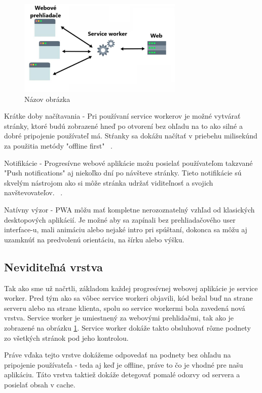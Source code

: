 \begin{figure}[H]
  \centering
  \includegraphics[width=0.7\textwidth]{img/image1.pdf}
  \caption{Názov obrázka \cite{Ater2017BuildingPWA}}
  \label{fig:obrazok1}
\end{figure}

Krátke doby načítavania - Pri používaní service workerov je možné vytvárať stránky, ktoré budú zobrazené hneď po otvorení bez ohľadu na to
ako silné a dobré pripojenie používateľ má. Stŕanky sa dokážu načítať v priebehu milisekúnd za použitia metódy "offline first" ~\cite{Ater2017BuildingPWA}.

Notifikácie - Progresívne webové aplikácie možu posielať používateľom takzvané "Push notifications" aj niekoľko dní po návšteve stránky. Tieto
notifikácie sú skvelým nástrojom ako si môže stránka udržať viditeľnosť a svojich navštevovateľov. ~\cite{Ater2017BuildingPWA}.

Natívny výzor - PWA môžu mať kompletne nerozoznatelný vzhľad od klasických desktopových aplikácií. Je možné aby sa zapínali bez prehliadačového
user interface-u, mali animáciu alebo nejaké intro pri spúštaní, dokonca sa môžu aj uzamknúť na predvolenú orientáciu, na šírku alebo výšku.

\subsection{Neviditeľná vrstva}
\label{sec:neviditeľnávrstva}
Tak ako sme už načrtli, základom každej progresívnej webovej aplikácie je service worker. Pred tým ako sa vôbec service workeri objavili, kód
bežal buď na strane serveru alebo na strane klienta, spolu so service workermi bola zavedená nová vrstva. Service worker je umiestnený za webovými
prehlidačmi, tak ako je zobrazené na obrázku \ref{fig:obrazok1}. Service worker dokáže takto obsluhovať rôzne podnety zo všetkých stránok pod jeho
kontrolou. 

Práve vďaka tejto vrstve dokážeme odpovedať na podnety bez ohľadu na pripojenie používateľa - teda aj keď je offline, práve to čo je vhodné pre
našu aplikáciu. Táto vrstva taktiež dokáže detegovať pomalé odozvy od servera a posielať obsah v cache.

